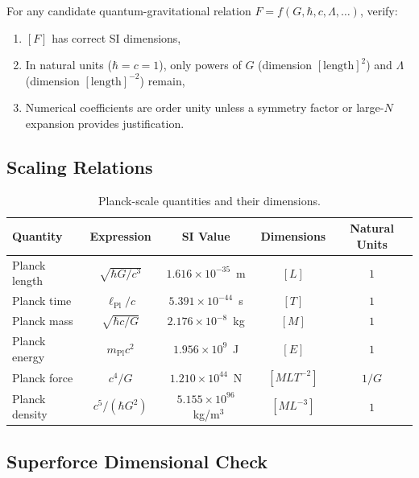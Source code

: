 \begin{lemma}
\label{lem:dimensional_check}
For any candidate quantum-gravitational relation $F = f(G, \hbar, c,
\Lambda, \ldots)$, verify:
\begin{enumerate}
    \item $[F]$ has correct SI dimensions,
    \item In natural units ($\hbar = c = 1$), only powers of $G$
          (dimension $[\text{length}]^2$) and $\Lambda$ (dimension
          $[\text{length}]^{-2}$) remain,
    \item Numerical coefficients are order unity unless a symmetry
          factor or large-$N$ expansion provides justification.
\end{enumerate}
\end{lemma}

\subsection{Scaling Relations}

\begin{table}[ht]
\centering
\begin{tabular}{lcccc}
\toprule
\textbf{Quantity} & \textbf{Expression} & \textbf{SI Value} &
\textbf{Dimensions} & \textbf{Natural Units} \\
\midrule
Planck length & $\sqrt{\hbar G/c^3}$ & $1.616 \times 10^{-35}$~m &
    $[L]$ & $1$ \\
Planck time & $\ell_{\mathrm{Pl}}/c$ & $5.391 \times 10^{-44}$~s &
    $[T]$ & $1$ \\
Planck mass & $\sqrt{\hbar c/G}$ & $2.176 \times 10^{-8}$~kg &
    $[M]$ & $1$ \\
Planck energy & $m_{\mathrm{Pl}} c^2$ & $1.956 \times 10^{9}$~J &
    $[E]$ & $1$ \\
Planck force & $c^4/G$ & $1.210 \times 10^{44}$~N &
    $[MLT^{-2}]$ & $1/G$ \\
Planck density & $c^5/(\hbar G^2)$ & $5.155 \times 10^{96}$~kg/m$^3$ &
    $[ML^{-3}]$ & $1$ \\
\bottomrule
\end{tabular}
\caption{Planck-scale quantities and their dimensions.}
\label{tab:planck_quantities}
\end{table}

\subsection{Superforce Dimensional Check}

